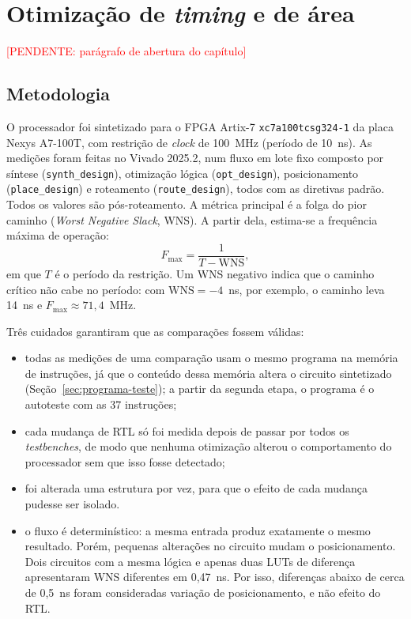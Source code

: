 \chapter{Otimização de \textit{timing} e de área}
\label{cap:otimizacao}
\textcolor{red}{[PENDENTE: parágrafo de abertura do capítulo]}

\section{Metodologia}

O processador foi sintetizado para o FPGA Artix-7 \texttt{xc7a100tcsg324-1}
da placa Nexys A7-100T, com restrição de \textit{clock} de 100~MHz (período
de 10~ns). As medições foram feitas no Vivado 2025.2, num fluxo em lote fixo
composto por síntese (\texttt{synth\_design}), otimização lógica
(\texttt{opt\_design}), posicionamento (\texttt{place\_design}) e roteamento
(\texttt{route\_design}), todos com as diretivas padrão. Todos os valores
são pós-roteamento. A métrica principal é a folga do pior caminho
(\textit{Worst Negative Slack}, WNS). A partir dela, estima-se a frequência
máxima de operação:
\begin{equation}
  F_{\max} = \frac{1}{T - \mathrm{WNS}},
\end{equation}
em que $T$ é o período da restrição. Um WNS negativo indica que o caminho
crítico não cabe no período: com $\mathrm{WNS} = -4$~ns, por exemplo, o
caminho leva 14~ns e $F_{\max} \approx 71{,}4$~MHz.

Três cuidados garantiram que as comparações fossem válidas:
\begin{itemize}
  \item todas as medições de uma comparação usam o mesmo programa na memória
    de instruções, já que o conteúdo dessa memória altera o circuito
    sintetizado (Seção~\ref{sec:programa-teste}); a partir da segunda etapa,
    o programa é o autoteste com as 37 instruções;
  \item cada mudança de RTL só foi medida depois de passar por todos os
    \textit{testbenches}, de modo que nenhuma otimização alterou o
    comportamento do processador sem que isso fosse detectado;
  \item foi alterada uma estrutura por vez, para que o efeito de cada
    mudança pudesse ser isolado.
  \item o fluxo é determinístico: a mesma entrada produz exatamente o mesmo
    resultado. Porém, pequenas alterações no circuito mudam o posicionamento.
    Dois circuitos com a mesma lógica e apenas duas LUTs de diferença
    apresentaram WNS diferentes em 0,47~ns. Por isso, diferenças abaixo de
    cerca de 0,5~ns foram consideradas variação de posicionamento, e não
    efeito do RTL.
\end{itemize}

